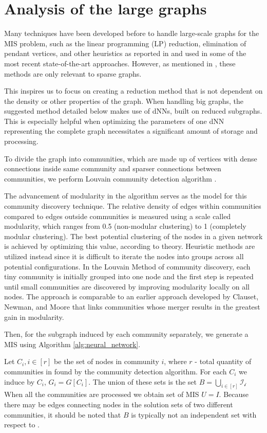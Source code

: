 \section{Analysis of the large graphs}

Many techniques have been developed before to handle large-scale graphs for the MIS problem, such as the linear programming (LP) reduction, elimination of pendant vertices, and other heuristics as reported in \cite{butenko_applications} and used in some of the most recent state-of-the-art approaches. However, as mentioned in \cite{redumis}, these methods are only relevant to sparse graphs.

This inspires us to focus on creating a reduction method that is not dependent on the density or other properties of the graph. When handling big graphs, the suggested method detailed below makes use of dNNs, built on reduced subgraphs. This is especially helpful when optimizing the parameters of one dNN representing the complete graph necessitates a significant amount of storage and processing. 

To divide the graph into communities, which are made up of vertices with dense connections inside same community and sparser connections between communities, we perform Louvain community detection algorithm \cite{Yang2016}. 

The advancement of modularity in the algorithm serves as the model for this community discovery technique. The relative density of edges within communities compared to edges outside communities is measured using a scale called modularity, which ranges from 0.5 (non-modular clustering) to 1 (completely modular clustering). The best potential clustering of the nodes in a given network is achieved by optimizing this value, according to theory. Heuristic methods are utilized instead since it is difficult to iterate the nodes into groups across all potential configurations. In the Louvain Method of community discovery, each tiny community is initially grouped into one node and the first step is repeated until small communities are discovered by improving modularity locally on all nodes. The approach is comparable to an earlier approach developed by Clauset, Newman, and Moore that links communities whose merger results in the greatest gain in modularity.

Then, for the subgraph induced by each community separately, we generate a MIS using Algorithm \ref{alg:neural_network}. 

Let $C_i, i\in[r]$ be the set of nodes in community $i$, where $r$ - total quantity of communities in \graphG found by the community detection algorithm. For each $C_i$ we induce \graphG by $C_i$, $G_i=G[C_i]$. The union of these sets is the set $B = \bigcup_{i \in [r]} \mathcal{I_i}$
When all the communities are processed we obtain set of MIS $U = I$. Because there may be edges connecting nodes in the solution sets of two different communities, it should be noted that $B$ is typically not an independent set with respect to \graphG.

